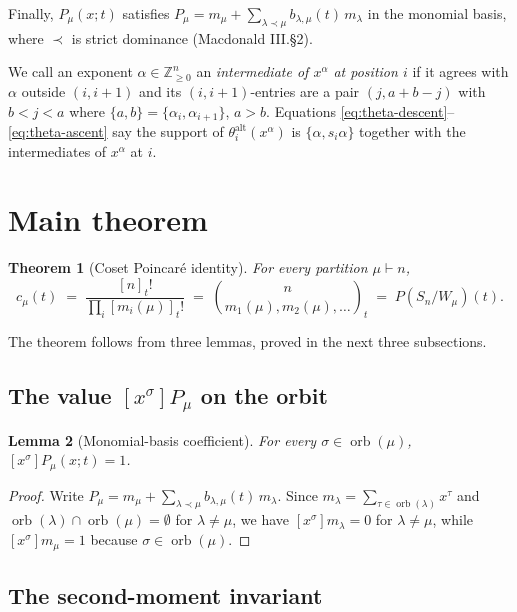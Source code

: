\documentclass[11pt]{article}
\newtheorem{theorem}{Theorem}
\newtheorem{lemma}[theorem]{Lemma}
\theoremstyle{definition}
\theoremstyle{remark}
\newcommand{\orb}{\operatorname{orb}}
\newcommand{\thetaalt}{\theta^{\mathrm{alt}}}
\begin{document}
Finally, $P_\mu(x;t)$ satisfies $P_\mu = m_\mu + \sum_{\lambda \prec \mu} b_{\lambda,\mu}(t)\,m_\lambda$
in the monomial basis, where $\prec$ is strict dominance
(Macdonald III.\S 2).

We call an exponent $\alpha \in \mathbb Z_{\ge 0}^n$ an \emph{intermediate
of $x^\alpha$ at position $i$} if it agrees with $\alpha$ outside $(i,i+1)$ and
its $(i,i+1)$-entries are a pair $(j, a+b-j)$ with
$b < j < a$ where $\{a,b\} = \{\alpha_i,\alpha_{i+1}\}$, $a > b$.
Equations \eqref{eq:theta-descent}--\eqref{eq:theta-ascent} say the support of
$\thetaalt_i(x^\alpha)$ is $\{\alpha, s_i\alpha\}$ together with the intermediates
of $x^\alpha$ at $i$.

\section{Main theorem}

\begin{theorem}[Coset Poincar\'e identity]\label{thm:main}
For every partition $\mu \vdash n$,
\[
  c_\mu(t) \;=\; \frac{[n]_t!}{\prod_i [m_i(\mu)]_t!}
            \;=\; \binom{n}{m_1(\mu),m_2(\mu),\ldots}_t
            \;=\; P(S_n/W_\mu)(t).
\]
\end{theorem}

The theorem follows from three lemmas, proved in the next three subsections.

\subsection{The value $[x^\sigma] P_\mu$ on the orbit}

\begin{lemma}[Monomial-basis coefficient]\label{lem:mono}
For every $\sigma \in \orb(\mu)$, $[x^\sigma] P_\mu(x;t) = 1$.
\end{lemma}

\begin{proof}
Write $P_\mu = m_\mu + \sum_{\lambda \prec \mu} b_{\lambda,\mu}(t)\, m_\lambda$. Since
$m_\lambda = \sum_{\tau \in \orb(\lambda)} x^\tau$ and $\orb(\lambda) \cap \orb(\mu) = \emptyset$
for $\lambda \ne \mu$, we have $[x^\sigma] m_\lambda = 0$ for $\lambda \ne \mu$, while
$[x^\sigma] m_\mu = 1$ because $\sigma \in \orb(\mu)$.
\end{proof}

\subsection{The second-moment invariant}
\end{document}

